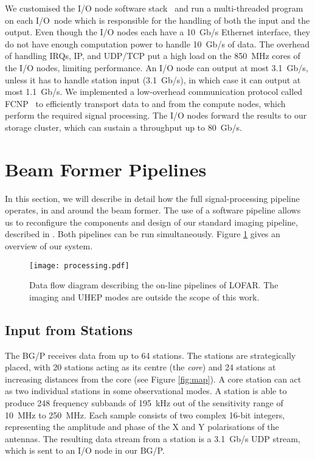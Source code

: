\documentclass{llncs}
\begin{document}
We customised the I/O node software stack~\cite{Yoshii:10} and run a multi-threaded program on each I/O~node which is responsible for the handling of both the input and the output. Even though the I/O nodes each have a 10~Gb/s Ethernet interface, they do not have enough computation power to handle 10~Gb/s of data. The overhead of handling IRQs, IP, and UDP/TCP put a high load on the 850~MHz cores of the I/O nodes, limiting performance. An I/O node can output at most 3.1~Gb/s, unless it has to handle station input (3.1~Gb/s), in which case it can output at most 1.1~Gb/s. We implemented a low-overhead communication protocol called FCNP~\cite{Romein:09a} to efficiently transport data to and from the compute nodes, which perform the required signal processing. The I/O nodes forward the results to our storage cluster, which can sustain a throughput up to 80~Gb/s.

\section{Beam Former Pipelines}

In this section, we will describe in detail how the full signal-processing pipeline operates, in and around the beam former. The use of a software pipeline allows us to reconfigure the components and design of our standard imaging pipeline, described in \cite{Romein:10a}. Both pipelines can be run simultaneously. Figure \ref{fig:processing} gives an overview of our system.

\begin{figure}[ht]
\center
\texttt{[image: processing.pdf]}
\caption{Data flow diagram describing the on-line pipelines of LOFAR. The imaging and UHEP modes are outside the scope of this work.}
\label{fig:processing}
\end{figure}

\subsection{Input from Stations}
The BG/P receives data from up to 64 stations. The stations are strategically placed, with 20 stations acting as its centre (the \emph{core}) and 24 stations at increasing distances from the core (see Figure \ref{fig:map}). A core station can act as two individual stations in some observational modes. A station is able to produce 248 frequency subbands of 195~kHz out of the sensitivity range of 10~MHz to 250~MHz. Each sample consists of two complex 16-bit integers, representing the amplitude and phase of the X and Y polarisations of the antennas. The resulting data stream from a station is a 3.1~Gb/s UDP stream, which is sent to an I/O node in our BG/P.
\end{document}
